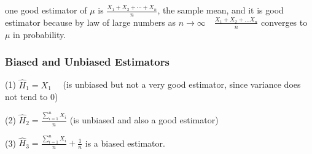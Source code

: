 \documentclass[10pt,leqno]{report}
\begin{document}
one good estimator of \(\mu\) is \(\frac{X_1+X_2+\cdots+X_n}{n}\), the sample mean, and it is good estimator because by law of large numbers as \(n \rightarrow \infty \quad \frac{X_1+X_2+\ldots X_n}{n}\) converges to \(\mu\) in probability.

\subsubsection{Biased and Unbiased Estimators}
(1) \(\hat{H }_1=X_1 \quad\) (is unbiased but not a very good estimator, since variance does not tend to $0$) 

(2) \(\hat{H}_2=\frac{\sum_{i=1}^n X_i}{n}\) (is unbiased and also a good estimator)

(3) \(\hat{H}_3=\frac{\sum_{i=1}^n X_i}{n}+\frac{1}{n}\) is a biased estimator.
\end{document}

